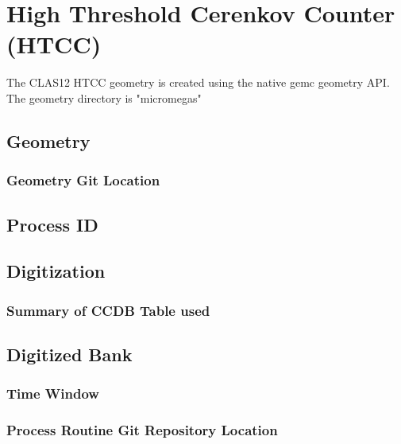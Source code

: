 \section{High Threshold Cerenkov Counter (HTCC)}

The CLAS12 HTCC geometry is created using the native gemc geometry API.
The geometry directory is "micromegas"


\subsection{Geometry}

\subsubsection{Geometry Git Location}

\subsection{Process ID}

\subsection{Digitization}

\subsubsection{Summary of CCDB Table used}

\subsection{Digitized Bank}

\subsubsection{Time Window}

\subsubsection{Process Routine Git Repository Location}


